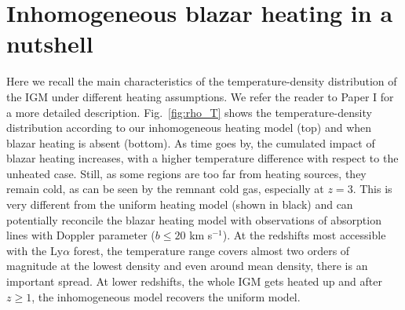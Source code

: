 \documentclass[numberedappendix]{emulateapj}
\begin{document}
\section{Inhomogeneous blazar heating in a nutshell}\label{sec:biased}

Here we recall the main characteristics of the temperature-density distribution of the IGM under different heating assumptions.  We refer the reader to Paper I for a more detailed description. Fig.~\ref{fig:rho_T} shows the temperature-density distribution according to our inhomogeneous heating model (top) and when blazar heating is absent (bottom). As time goes by, the cumulated impact of blazar heating increases, with a higher temperature difference with respect to the unheated case. Still, as some regions are too far from heating sources, they remain cold, as can be seen by the remnant cold gas, especially at $z=3$. This is very different from the uniform heating model (shown in black) and can potentially reconcile the blazar heating model with observations of absorption lines with Doppler parameter ($b\leq 20$ km s$^{-1}$). At the redshifts most accessible with the Ly$\alpha$ forest, the temperature range  covers almost two orders of magnitude at the lowest density and  even around mean density, there is an important spread. At lower redshifts, the whole IGM gets heated up and after $z\geqslant1$, the inhomogeneous model recovers the uniform model. 
\end{document}
